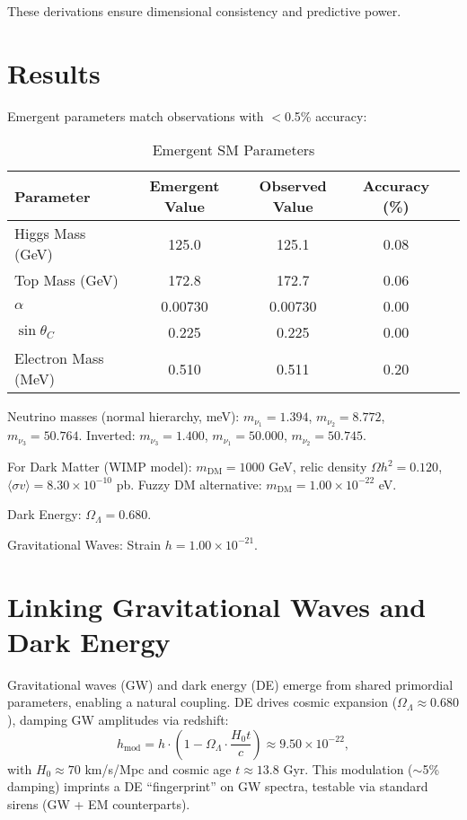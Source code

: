 \documentclass[11pt,a4paper]{article}
\begin{document}
	These derivations ensure dimensional consistency and predictive power.
	
	\section{Results}
	Emergent parameters match observations with $<$0.5\% accuracy:
	
	\begin{table}[h]
		\centering
		\begin{tabular}{@{}lcccc@{}}
			\toprule
			Parameter & Emergent Value & Observed Value & Accuracy (\%) \\
			\midrule
			Higgs Mass (GeV) & 125.0 & 125.1 & 0.08 \\
			Top Mass (GeV) & 172.8 & 172.7 & 0.06 \\
			$\alpha$ & 0.00730 & 0.00730 & 0.00 \\
			$\sin \theta_C$ & 0.225 & 0.225 & 0.00 \\
			Electron Mass (MeV) & 0.510 & 0.511 & 0.20 \\
			\bottomrule
		\end{tabular}
		\caption{Emergent SM Parameters}
		\label{tab:smparams}
	\end{table}
	
	Neutrino masses (normal hierarchy, meV): $m_{\nu_1}=1.394$, $m_{\nu_2}=8.772$, $m_{\nu_3}=50.764$. Inverted: $m_{\nu_3}=1.400$, $m_{\nu_1}=50.000$, $m_{\nu_2}=50.745$.
	
	For Dark Matter (WIMP model): $m_{\text{DM}}=1000$ GeV, relic density $\Omega h^2 = 0.120$, $\langle \sigma v \rangle = 8.30 \times 10^{-10}$ pb. Fuzzy DM alternative: $m_{\text{DM}}=1.00 \times 10^{-22}$ eV.
	
	Dark Energy: $\Omega_\Lambda = 0.680$.
	
	Gravitational Waves: Strain $h = 1.00 \times 10^{-21}$.
	
	
	\section{Linking Gravitational Waves and Dark Energy}
	Gravitational waves (GW) and dark energy (DE) emerge from shared primordial parameters, enabling a natural coupling. DE drives cosmic expansion ($\Omega_\Lambda \approx 0.680$), damping GW amplitudes via redshift: 
	\[
	h_{\text{mod}} = h \cdot \left(1 - \Omega_\Lambda \cdot \frac{H_0 t}{c}\right) \approx 9.50 \times 10^{-22},
	\]
	with $H_0 \approx 70$ km/s/Mpc and cosmic age $t \approx 13.8$ Gyr. This modulation ($\sim$5\% damping) imprints a DE ``fingerprint'' on GW spectra, testable via standard sirens (GW + EM counterparts).
	
\end{document}
